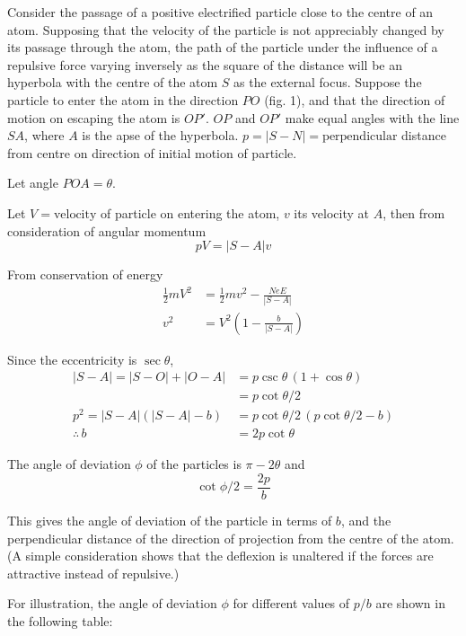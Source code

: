 \documentclass[12pt]{article}
\begin{document}
\bigskip
Consider the passage of a positive electrified particle close to the centre of an atom.
Supposing that the velocity of the particle is not appreciably changed by its passage through the atom,
the path of the particle under the influence of a repulsive force varying inversely as the square of the
distance will be an hyperbola with the centre of the atom $S$ as the external focus.
Suppose the particle to enter the atom in the direction $PO$ (fig. 1),
and that the direction of motion
on escaping the atom is $OP'$.
$OP$ and $OP'$ make equal angles with the line $SA$,
where $A$ is the apse of the hyperbola.
$p=|S-N|=\text{perpendicular}$ distance from centre on direction of initial motion of particle.

\bigskip
Let angle $POA=\theta$.

\bigskip
Let $V=\text{velocity}$ of particle on entering the atom, $v$ its velocity at $A$,
then from consideration of angular momentum
\begin{equation*}
pV=|S-A|v
\end{equation*}

From conservation of energy
\begin{align*}
\tfrac{1}{2}mV^2&=\tfrac{1}{2}mv^2-\frac{NeE}{|S-A|}
\\
v^2&=V^2\left(1-\frac{b}{|S-A|}\right)
\end{align*}

Since the eccentricity is $\sec\theta$,
\begin{align*}
|S-A|=|S-O|+|O-A|&=p\csc\theta\,(1+\cos\theta)
\\
&=p\cot\theta/2
\\
p^2=|S-A|(|S-A|-b)&=p\cot\theta/2\,(p\cot\theta/2-b)
\\
\therefore\,b&=2p\cot\theta
\end{align*}

The angle of deviation $\phi$ of the particles is $\pi-2\theta$ and
\begin{equation*}
\cot\phi/2=\frac{2p}{b}
\tag{1}
\end{equation*}

This gives the angle of deviation of the particle in terms of $b$,
and the perpendicular distance of the direction of projection from the centre of the atom.
(A simple consideration shows that the deflexion is unaltered if the forces are attractive instead of repulsive.)

\bigskip
For illustration, the angle of deviation $\phi$ for different values of $p/b$ are shown in the following table:
\end{document}
